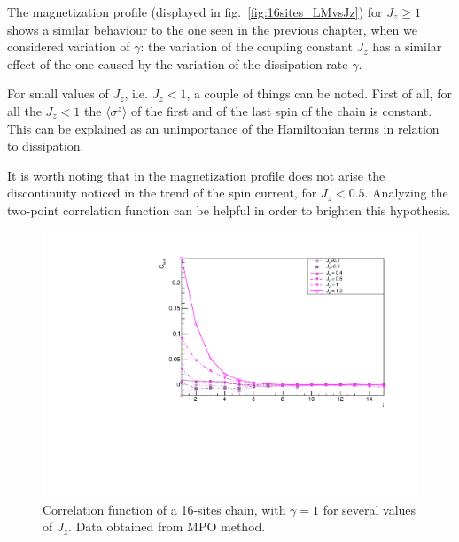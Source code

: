 The magnetization profile (displayed in fig.~\ref{fig:16sites_LMvsJz}) for $J_z \geq 1$ shows a similar behaviour to the one seen in the previous chapter, when we considered variation of $\gamma$: the variation of the coupling constant $J_z$ has a similar effect of the one caused by the variation of the dissipation rate $\gamma$. 

For small values of $J_z$, i.e. $J_z < 1$, a couple of things can be noted. First of all, for all the $J_z < 1$ the $\langle \sigma^z \rangle$ of the first and of the last spin of the chain is constant. This can be explained as an unimportance of the Hamiltonian terms in relation to dissipation. 

It is worth noting that in the magnetization profile does not arise the discontinuity noticed in the trend of the spin current, for $J_z < 0.5$. Analyzing the two-point correlation function can be helpful in order to brighten this hypothesis.




\begin{figure}[H]
    \centering
    \includegraphics[scale=0.7]{Figures/16sites/16sites_CFBulkCONNvsJz.pdf}
    \captionsetup{width=1.\linewidth}
    \caption{Correlation function of a 16-sites chain, with $\gamma = 1$ for several values of $J_z$. Data obtained from MPO method.}
    \label{fig:16sites_CFBulkCONNvsJz}
\end{figure}

